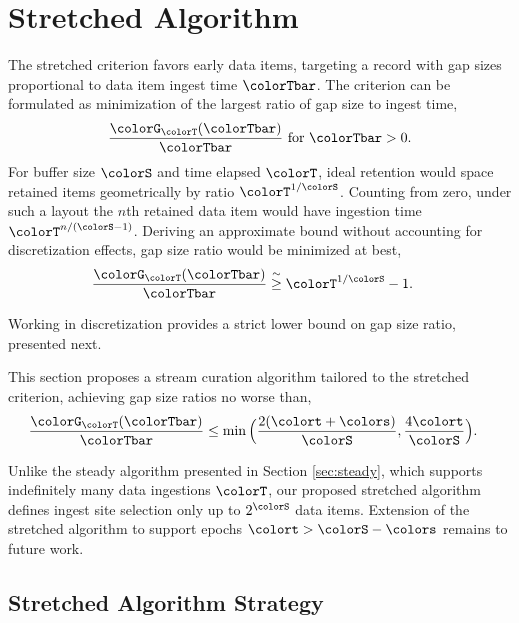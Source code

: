 \section{Stretched Algorithm} \label{sec:stretched}

The stretched criterion favors early data items, targeting a record with gap sizes proportional to data item ingest time $\colorTbar$.
The criterion can be formulated as minimization of the largest ratio of gap size to ingest time,
\begin{align*}
\frac{\colorG_{\colorT}(\colorTbar)}{\colorTbar} \text{ for } \colorTbar > 0.
\end{align*}
For buffer size $\colorS$ and time elapsed $\colorT$, ideal retention would space retained items geometrically by ratio $\colorT^{1/\colorS}$.
Counting from zero, under such a layout the $n$th retained data item would have ingestion time $\colorT^{n/(\colorS - 1)}$.
Deriving an approximate bound without accounting for discretization effects, gap size ratio would be minimized at best,
\begin{align}
\label{eqn:approx-gap-bound}
\frac{\colorG_{\colorT}(\colorTbar)}{\colorTbar}
&\stackrel{\sim}{\geq}
\colorT^{1/\colorS} - 1.
\end{align}

Working in discretization provides a strict lower bound on gap size ratio, presented next.



This section proposes a stream curation algorithm tailored to the stretched criterion, achieving gap size ratios no worse than,
\begin{align*}
\frac{\colorG_{\colorT}(\colorTbar)}{\colorTbar}
&\leq
\min\Big(
  \frac{2(\colort + \colors)}{\colorS},
  \frac{4\colort}{\colorS}
\Big).
\end{align*}

Unlike the steady algorithm presented in Section \ref{sec:steady}, which supports indefinitely many data ingestions $\colorT$, our proposed stretched algorithm defines ingest site selection only up to $2^{\colorS}$ data items.
Extension of the stretched algorithm to support epochs $\colort > \colorS - \colors$ remains to future work.

\subsection{Stretched Algorithm Strategy}
\label{sec:stretched-strategy}

